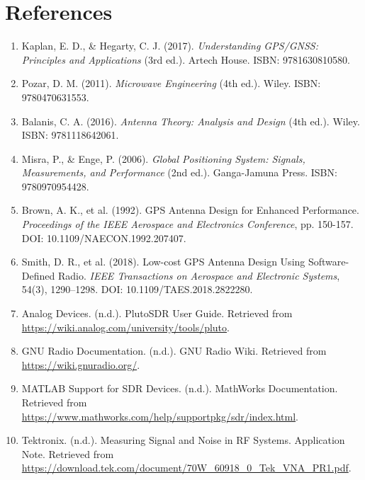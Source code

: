\documentclass[12pt,letter]{article}
\begin{document}
\section*{References}

\begin{enumerate}
    \item Kaplan, E. D., \& Hegarty, C. J. (2017). \textit{Understanding GPS/GNSS: Principles and Applications} (3rd ed.). Artech House. ISBN: 9781630810580.
    
    \item Pozar, D. M. (2011). \textit{Microwave Engineering} (4th ed.). Wiley. ISBN: 9780470631553.
    
    \item Balanis, C. A. (2016). \textit{Antenna Theory: Analysis and Design} (4th ed.). Wiley. ISBN: 9781118642061.
    
    \item Misra, P., \& Enge, P. (2006). \textit{Global Positioning System: Signals, Measurements, and Performance} (2nd ed.). Ganga-Jamuna Press. ISBN: 9780970954428.
    
    \item Brown, A. K., et al. (1992). GPS Antenna Design for Enhanced Performance. \textit{Proceedings of the IEEE Aerospace and Electronics Conference}, pp. 150-157. DOI: 10.1109/NAECON.1992.207407.
    
    \item Smith, D. R., et al. (2018). Low-cost GPS Antenna Design Using Software-Defined Radio. \textit{IEEE Transactions on Aerospace and Electronic Systems}, 54(3), 1290–1298. DOI: 10.1109/TAES.2018.2822280.
    
    \item Analog Devices. (n.d.). PlutoSDR User Guide. Retrieved from \url{https://wiki.analog.com/university/tools/pluto}.
    
    \item GNU Radio Documentation. (n.d.). GNU Radio Wiki. Retrieved from \url{https://wiki.gnuradio.org/}.
    
    \item MATLAB Support for SDR Devices. (n.d.). MathWorks Documentation. Retrieved from \url{https://www.mathworks.com/help/supportpkg/sdr/index.html}.
    
    \item Tektronix. (n.d.). Measuring Signal and Noise in RF Systems. Application Note. Retrieved from \url{https://download.tek.com/document/70W_60918_0_Tek_VNA_PR1.pdf}.
    

\end{enumerate}
\end{document}
